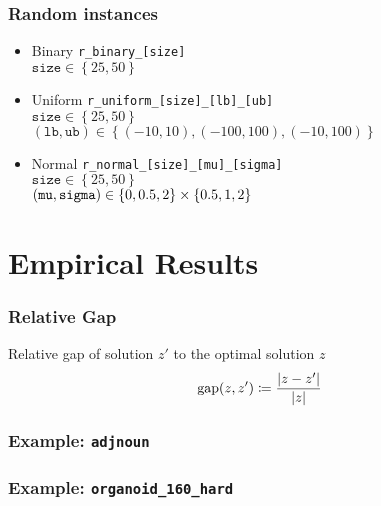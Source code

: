 \documentclass{beamer}
\begin{document}
\begin{frame}
	\frametitle{Random instances}	
	\begin{itemize}
		\item<1-> Binary \texttt{r\_binary\_[size]} \\
			$\texttt{size} \in \left\{ 25, 50 \right\}$
		\item<2-> Uniform \texttt{r\_uniform\_[size]\_[lb]\_[ub]} \\
			$\texttt{size} \in \left\{ 25, 50 \right\}$ \\
			$(\texttt{lb}, \texttt{ub}) \in \left\{ (-10, 10), (-100, 100), (-10, 100) \right\}$
		\item<3-> Normal \texttt{r\_normal\_[size]\_[mu]\_[sigma]} \\
			$\texttt{size} \in \left\{ 25, 50 \right\}$ \\
			$(\text{\texttt{mu}}, \text{\texttt{sigma}}) \in \left\{ 0, 0.5, 2 \right\} \times \left\{ 0.5, 1, 2 \right\}$

	\end{itemize}
\end{frame}

\section{Empirical Results}
\begin{frame}
	\frametitle{Relative Gap}
	Relative gap of solution $z'$ to the optimal solution $z$
	\[
		\operatorname{\text{gap}}(z, z') \coloneqq \frac{\lvert z - z' \rvert}{\lvert z \rvert}
	\]
\end{frame}

\begin{frame}
	\frametitle{Example: \texttt{adjnoun}}
	\begin{figure}
		\centering
	\end{figure}
\end{frame}

\begin{frame}
	\frametitle{Example: \texttt{organoid\_160\_hard}}
	\begin{figure}
		\centering
	\end{figure}
\end{frame}
\end{document}
